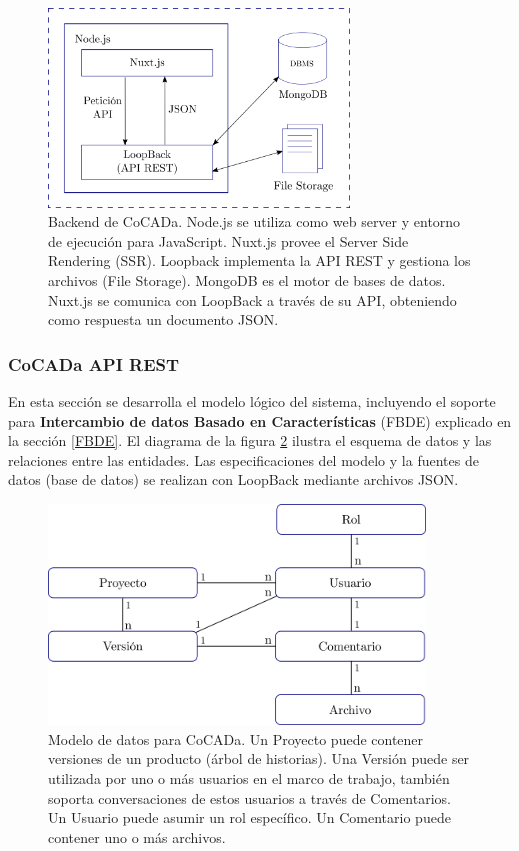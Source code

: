 \begin{figure}[h]
    \includegraphics[width=8cm]{Img/Desarrollo/backendf.png}
    \centering
    \caption{\footnotesize{Backend de CoCADa. Node.js se utiliza como web server y entorno de ejecución para JavaScript. Nuxt.js provee el Server Side Rendering (SSR). Loopback implementa la API REST y gestiona los archivos (File Storage). MongoDB es el motor de bases de datos. Nuxt.js se comunica con LoopBack a través de su API, obteniendo como respuesta un documento JSON.}}
     \label{fig:sistema0}
\end{figure}

\subsubsection{CoCADa API REST}
En esta sección se desarrolla el modelo lógico del sistema, incluyendo el soporte para \textbf{Intercambio de datos Basado en Características} (FBDE) explicado en la sección \ref{FBDE}. El diagrama de la figura \ref{fig:schema} ilustra el esquema de datos y las relaciones entre las entidades. Las especificaciones del modelo y la fuentes de datos (base de datos) se realizan con LoopBack mediante archivos JSON.



\begin{figure}[h]
    \includegraphics[width=10cm]{Img/Desarrollo/cocada-de0.png}
    \centering
    \caption{Modelo de datos para CoCADa. Un Proyecto puede contener versiones de un producto (árbol de historias). Una Versión puede ser utilizada por uno o más usuarios en el marco de trabajo, también soporta conversaciones de estos usuarios a través de Comentarios. Un Usuario puede asumir un rol específico. Un Comentario puede contener uno o más archivos. }
    \label{fig:schema}
\end{figure}

